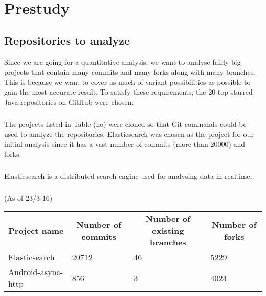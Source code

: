 \chapter{Prestudy}
\section{Repositories to analyze}
Since we are going for a quantitative analysis, we want to analyse fairly big projects that contain many commits and many forks along with many branches. This is because we want to cover as much of variant possibilities as possible to gain the most accurate result. To satisfy these requirements, the 20 top starred Java repositories on GitHub were chosen.
\paragraph*{}
The projects listed in Table (no) were cloned so that Git commands could be used to analyze the repositories. Elasticsearch was chosen as the project for our initial analysis since it has a vast number of commits (more than 20000) and forks.
\paragraph*{}
Elasticsearch is a distributed search engine used for analysing data in realtime. 
\paragraph*{}
(As of 23/3-16)
\begin{tabular}{ l l l l}
\hline
\multicolumn{1}{c}{\textbf{Project name}} & \multicolumn{1}{c}{\textbf{Number of commits}} & \multicolumn{1}{c}{\textbf{Number of existing branches}} & \multicolumn{1}{c}{\textbf{Number of forks}}\\
Elasticsearch & 20712 & 46 & 5229\\
Android-async-http & 856 & 3 & 4024
\end{tabular}